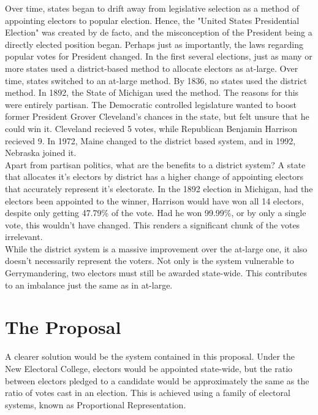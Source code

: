 \documentclass{article}
\begin{document}
    Over time, states began to drift away from legislative selection as a method of appointing electors to popular election. Hence, the "United States Presidential Election" was created by de facto, and the misconception of the President being a directly elected position began. Perhaps just as importantly, the laws regarding popular votes for President changed. In the first several elections, just as many or more states used a district-based method to allocate electors as at-large. Over time, states switched to an at-large method. By 1836, no states used the district method. In 1892, the State of Michigan used the method. The reasons for this were entirely partisan. The Democratic controlled legislature wanted to boost former President Grover Cleveland's chances in the state, but felt unsure that he could win it. Cleveland recieved 5 votes, while Republican Benjamin Harrison recieved 9. In 1972, Maine changed to the district based system, and in 1992, Nebraska joined it. \\

    Apart from partisan politics, what are the benefits to a district system? A state that allocates it's electors by district has a higher change of appointing electors that accurately represent it's electorate. In the 1892 election in Michigan, had the electors been appointed to the winner, Harrison would have won all 14 electors, despite only getting 47.79\% of the vote. Had he won 99.99\%, or by only a single vote, this wouldn't have changed. This renders a significant chunk of the votes irrelevant. \\

    While the district system is a massive improvement over the at-large one, it also doesn't necessarily represent the voters. Not only is the system vulnerable to Gerrymandering, two electors must still be awarded state-wide. This contributes to an imbalance just the same as in at-large. \\

    \section{The Proposal}%

    A clearer solution would be the system contained in this proposal. Under the New Electoral College, electors would be appointed state-wide, but the ratio between electors pledged to a candidate would be approximately the same as the ratio of votes cast in an election. This is achieved using a family of electoral systems, known as Proportional Representation. \\
\end{document}
